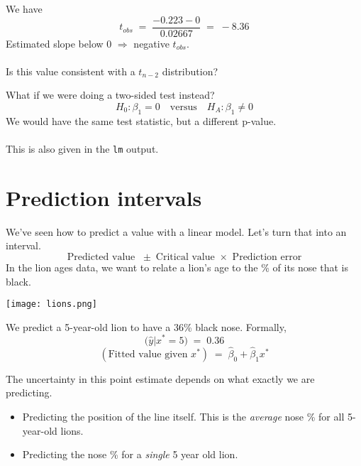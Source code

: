 \documentclass[xcolor={dvipsnames,svgnames},14pt]{beamer}
\begin{document}
\begin{frame}
We have
$$t_{obs} \;=\; \frac{-0.223 - 0}{0.02667} \;=\; -8.36$$
Estimated slope below 0 $\Rightarrow$ negative $t_{obs}$. \\~\\
Is this value consistent with a $t_{n-2}$ distribution?
\end{frame}


\begin{frame}
What if we were doing a two-sided test instead?
$$H_0: \beta_1 = 0 \quad \text{versus} \quad H_A: \beta_1 \neq 0$$
We would have the same test statistic, but a different p-value. \\~\\

This is also given in the \texttt{lm} output.
\end{frame}


\section{Prediction intervals}

\begin{frame}
We've seen how to predict a value with a linear model.  Let's turn that into an interval.
$$\text{Predicted value } \;\pm\; \text{Critical value }\times\text{ Prediction error}$$
In the lion ages data, we want to relate a lion's age to the \% of its nose that is black.
\end{frame}

\begin{frame}
\begin{center}
\texttt{[image: lions.png]}
\end{center}
\end{frame}

\begin{frame}
We predict a 5-year-old lion to have a 36\% black nose. Formally,
$$\Big( \hat{y} | x^* = 5 \Big) \;=\; 0.36$$
$$(\text{Fitted value given } x^*) \;=\; \hat{\beta}_0 + \hat{\beta}_1 x^*$$
\end{frame}

\begin{frame}
The uncertainty in this point estimate depends on what exactly we are predicting.  \begin{itemize}
\item Predicting the position of the line itself.  This is the \textit{average} nose \% for all 5-year-old lions. 
\item Predicting the nose \% for a \textit{single} 5 year old lion.
\end{itemize}
\end{frame}
\end{document}
